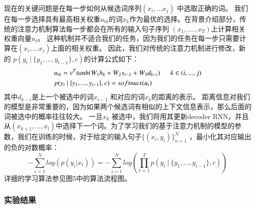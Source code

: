 现在的关键问题是在每一步如何从候选词序列$(x_i, ... x_j)$ 中选取正确的词。
我们在每一步选择具有最高相关权重$u_{tk}$的词$x_k$作为最优的选择。在背景介绍部分，传统的注意力机制算法每一步都会在所有的输入句子序列 $(x_1, .... , x_T)$上计算相关权重向量$u_t$。
这种机制并不适合我们的任务，因为我们的任务在每一步只需要计算在$(x_i, ... x_j)$上面的相关权重。
因此，我们对传统的注意力机制进行修改，新的 $p(y_{t} \ | \ \{y_1, ..., y_{t-1}\}, c)$的计算公式如下：
\begin{equation}
\begin{split}
&u_{tk} = v^T tanh(W_1h_k + W_2s_{t-1}  + W_3d_{k-i}) \indent  k \in (i, ... ,j)  \\
&p(y_{t} \ | \ \{y_1, ..., y_{t-1}\}, c) = softmax(u_t)
\end{split}
\end{equation}
其中$d_{k-i}$是上一个被选中的词$x_{i-1}$ 和对应的词$x_k$的距离的表示。
距离信息对我们的模型是非常重要的，因为如果两个候选词有相似的上下文信息表示，那么后面的词被选中的概率往往较大。
一旦$x_k$ 被选中，我们将用其更新decoder RNN，并且从$(x_{k+1}, ... , x_{l})$中选择下一个词。为了学习我们的基于注意力机制的模型的参数，我们在训练的时候，对于给定的输入句子$\{(x_i, y_i)\}_{n=1}^{N}$ ，最小化其对应输出的负的对数概率：
\begin{equation}
-\sum_{i=1}^{N}log(p(y_i|x_i)) = -\sum_{i=1}^{N}log(\prod_{t=1}^{T}p(y_{t} \ | \ \{y_1, ..., y_{t-1}\}, c))
\end{equation}
详细的学习算法参见图5中的算法流程图。








\subsubsection{实验结果}

